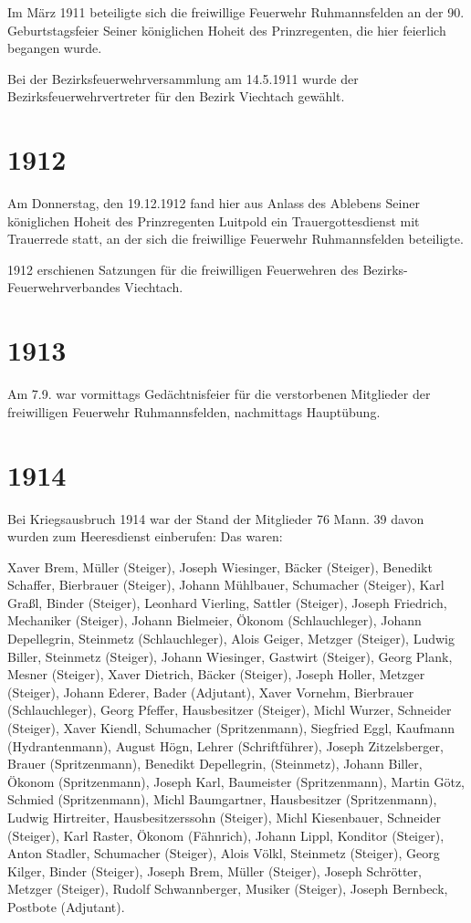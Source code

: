 \documentclass[12pt,a4paper]{book}
\begin{document}
Im März 1911 beteiligte sich die freiwillige Feuerwehr Ruhmannsfelden an der 90.
Geburtstagsfeier Seiner königlichen Hoheit des Prinzregenten, die hier feierlich
begangen wurde.

Bei der Bezirksfeuerwehrversammlung am 14.5.1911 wurde der
Bezirksfeuerwehrvertreter für den Bezirk Viechtach gewählt.

\section*{1912}

Am Donnerstag, den 19.12.1912 fand hier aus Anlass des Ablebens Seiner
königlichen Hoheit des Prinzregenten Luitpold ein Trauergottesdienst mit
Trauerrede statt, an der sich die freiwillige Feuerwehr Ruhmannsfelden
beteiligte.

1912 erschienen Satzungen für die freiwilligen Feuerwehren des
Bezirks-Feuerwehrverbandes Viechtach.

\section*{1913}

Am 7.9. war vormittags Gedächtnisfeier für die verstorbenen Mitglieder der
freiwilligen Feuerwehr Ruhmannsfelden, nachmittags Hauptübung.

\section*{1914}

Bei Kriegsausbruch 1914 war der Stand der Mitglieder 76 Mann. 39 davon wurden
zum Heeresdienst einberufen: Das waren:

Xaver Brem, Müller (Steiger), Joseph Wiesinger, Bäcker (Steiger), Benedikt
Schaffer, Bierbrauer (Steiger), Johann Mühlbauer, Schumacher (Steiger), Karl
Graßl, Binder (Steiger), Leonhard Vierling, Sattler (Steiger), Joseph Friedrich,
Mechaniker (Steiger), Johann Bielmeier, Ökonom (Schlauchleger), Johann
Depellegrin, Steinmetz (Schlauchleger), Alois Geiger, Metzger (Steiger), Ludwig
Biller, Steinmetz (Steiger), Johann Wiesinger, Gastwirt (Steiger), Georg Plank,
Mesner (Steiger), Xaver Dietrich, Bäcker (Steiger), Joseph Holler, Metzger
(Steiger), Johann Ederer, Bader (Adjutant), Xaver Vornehm, Bierbrauer
(Schlauchleger), Georg Pfeffer, Hausbesitzer (Steiger), Michl Wurzer, Schneider
(Steiger), Xaver Kiendl, Schumacher (Spritzenmann), Siegfried Eggl, Kaufmann
(Hydrantenmann), August Högn, Lehrer (Schriftführer), Joseph Zitzelsberger,
Brauer (Spritzenmann), Benedikt Depellegrin, (Steinmetz), Johann Biller, Ökonom
(Spritzenmann), Joseph Karl, Baumeister (Spritzenmann), Martin Götz, Schmied
(Spritzenmann), Michl Baumgartner, Hausbesitzer (Spritzenmann), Ludwig
Hirtreiter, Hausbesitzerssohn (Steiger), Michl Kiesenbauer, Schneider (Steiger),
Karl Raster, Ökonom (Fähnrich), Johann Lippl, Konditor (Steiger), Anton Stadler,
Schumacher (Steiger), Alois Völkl, Steinmetz (Steiger), Georg Kilger, Binder
(Steiger), Joseph Brem, Müller (Steiger), Joseph Schrötter, Metzger (Steiger),
Rudolf Schwannberger, Musiker (Steiger), Joseph Bernbeck, Postbote (Adjutant).
\end{document}
